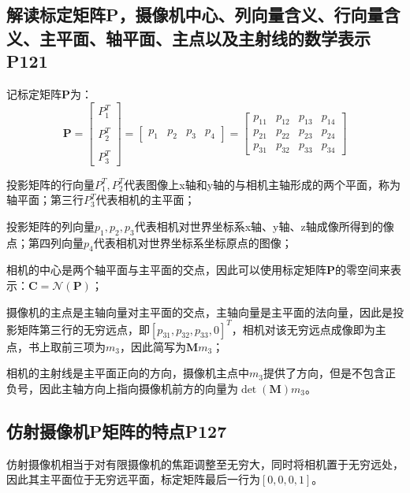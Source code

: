 \documentclass[11pt]{article}
\begin{document}
\subsection{解读标定矩阵P，摄像机中心、列向量含义、行向量含义、主平面、轴平面、主点以及主射线的数学表示P121}
记标定矩阵$\mathbold{P}$为：
\begin{equation*}
  \mathbold{P}=\begin{bmatrix}
    P_1^T \\\\
    P_2^T \\\\
    P_3^T
  \end{bmatrix}
  =\begin{bmatrix}
    p_1 & p_2 & p_3 & p_4
  \end{bmatrix}=\begin{bmatrix}
    p_{11} & p_{12} & p_{13} & p_{14} \\
    p_{21} & p_{22} & p_{23} & p_{24} \\
    p_{31} & p_{32} & p_{33} & p_{34}
  \end{bmatrix}
\end{equation*}\par
投影矩阵的行向量$P_1^T,P_2^T$代表图像上x轴和y轴的与相机主轴形成的两个平面，称为轴平面；第三行$P_3^T$代表相机的主平面；\par
投影矩阵的列向量$p_1,p_2,p_3$代表相机对世界坐标系x轴、y轴、z轴成像所得到的像点；第四列向量$p_4$代表相机对世界坐标系坐标原点的图像；\par
相机的中心是两个轴平面与主平面的交点，因此可以使用标定矩阵$\mathbold{P}$的零空间来表示：$\mathbold{C}=\mathcal{N}(\mathbold{P})$；\par
摄像机的主点是主轴向量对主平面的交点，主轴向量是主平面的法向量，因此是投影矩阵第三行的无穷远点，即$[p_{31},p_{32},p_{33},0]^T$，相机对该无穷远点成像即为主点，书上取前三项为$m_3$，因此简写为$\mathbold{M}m_3$；\par
相机的主射线是主平面正向的方向，摄像机主点中$m_3$提供了方向，但是不包含正负号，因此主轴方向上指向摄像机前方的向量为$\det(\mathbold{M})m_3$。
\subsection{	仿射摄像机P矩阵的特点P127}
仿射摄像机相当于对有限摄像机的焦距调整至无穷大，同时将相机置于无穷远处，因此其主平面位于无穷远平面，标定矩阵最后一行为$[0,0,0,1]$。
\end{document}
